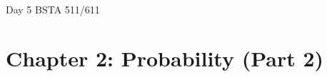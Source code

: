 \documentclass[12pt]{amsart}
\newtheorem{example}[theorem]{Example}
\begin{document}
\setcounter{section}{2}
\setcounter{subsection}{4}
\setcounter{theorem}{6}
Day 5 BSTA 511/611
{\huge  
\section*{Chapter 2: Probability (Part 2)}
}





%
%
%
%
%
%
%
%
%
%
%
%
%


\end{document}
